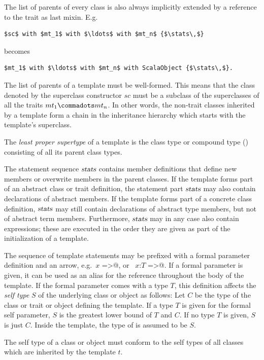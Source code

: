 The list of parents of every class is also always implicitly extended
by a reference to the  trait as last
mixin. E.g.\
\begin{lstlisting}
$sc$ with $mt_1$ with $\ldots$ with $mt_n$ {$\stats\,$}
\end{lstlisting}
becomes
\begin{lstlisting}
$mt_1$ with $\ldots$ with $mt_n$ with ScalaObject {$\stats\,$}.
\end{lstlisting}

The list of parents of a template must be well-formed. This means that
the class denoted by the superclass constructor $sc$ must be a
subclass of the superclasses of all the traits $mt_1 \commadots mt_n$.
In other words, the non-trait classes inherited by a template form a
chain in the inheritance hierarchy which starts with the template's
superclass.

The {\em least proper supertype} of a template is the class type or
compound type (\sref{sec:compound-types}) consisting of all its parent
class types. 

The statement sequence $\mbox{\sl stats}$ contains member definitions that
define new members or overwrite members in the parent classes.  If the
template forms part of an abstract class or trait definition, the
statement part $\mbox{\sl stats}$ may also contain declarations of abstract
members. If the template forms part of a concrete class definition,
$\mbox{\sl stats}$ may still contain declarations of abstract type members, but
not of abstract term members.  Furthermore, $\mbox{\sl stats}$ may in any case
also contain expressions; these are executed in the order they are
given as part of the initialization of a template.

The sequence of template statements may be prefixed with a formal
parameter definition and an arrow, e.g.\ \lstinline@$x$ =>@, or
~\lstinline@$x$:$T$ =>@.  If a formal parameter is given, it can be
used as an alias for the reference \lstinline@this@ throughout the
body of the template.  
If the formal parameter comes with a type $T$, this definition affects
the {\em self type} $S$ of the underlying class or object as follows:  Let $C$ be the type
of the class or trait or object defining the template.
If a type $T$ is given for the formal self parameter, $S$
is the greatest lower bound of $T$ and $C$.
If no type $T$ is given, $S$ is just $C$.
Inside the template, the type of  is assumed to be $S$.

The self type of a class or object must conform to the self types of
all classes which are inherited by the template $t$. 

